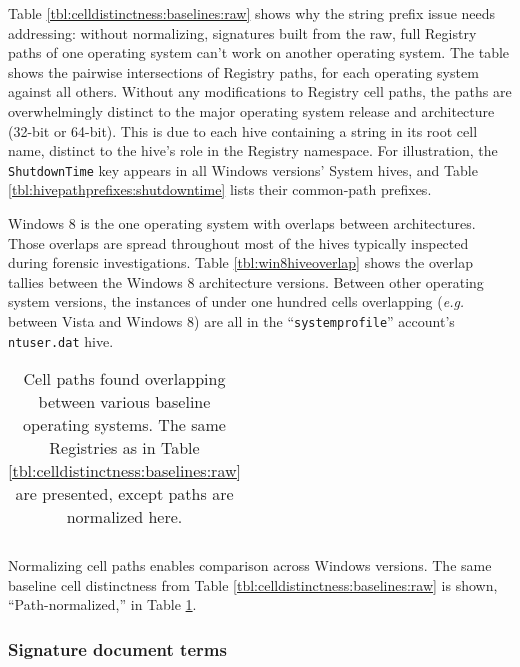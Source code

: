 \documentclass[11pt]{ucthesis}
\theoremstyle{plain}
\theoremstyle{definition}
\newcommand{\eg}{\emph{e.g.}\xspace}
\begin{document}
Table \ref{tbl:celldistinctness:baselines:raw} shows why the string prefix issue needs addressing: without normalizing, signatures built from the raw, full Registry paths of one operating system can't work on another operating system.  The table shows the pairwise intersections of Registry paths, for each operating system against all others.  Without any modifications to Registry cell paths, the paths are overwhelmingly distinct to the major operating system release and architecture (32-bit or 64-bit).  This is due to each hive containing a string in its root cell name, distinct to the hive's role in the Registry namespace.  For illustration, the \texttt{ShutdownTime} key appears in all Windows versions' System hives, and Table \ref{tbl:hivepathprefixes:shutdowntime} lists their common-path prefixes.

Windows 8 is the one operating system with overlaps between architectures.  Those overlaps are spread throughout most of the hives typically inspected during forensic investigations.  Table \ref{tbl:win8hiveoverlap} shows the overlap tallies between the Windows 8 architecture versions.  Between other operating system versions, the instances of under one hundred cells overlapping (\eg between Vista and Windows 8) are all in the ``\texttt{systemprofile}'' account's \texttt{ntuser.dat} hive.

\begin{table}[htp]
\caption{Cell paths found overlapping between various baseline operating systems.  The same Registries as in Table \ref{tbl:celldistinctness:baselines:raw} are presented, except paths are normalized here.}
\begin{center}
\begin{small}
\begin{tabular}{rrrrrrrrr}
\toprule

\bottomrule
\end{tabular}
\end{small}
\end{center}
\label{tbl:celldistinctness:baselines:normalized}
\end{table}

Normalizing cell paths enables comparison across Windows versions.  The same baseline cell distinctness from Table \ref{tbl:celldistinctness:baselines:raw} is shown, ``Path-normalized,'' in Table \ref{tbl:celldistinctness:baselines:normalized}.


\subsubsection{Signature document terms}
\label{sec:modelparameters:terms}
\end{document}
